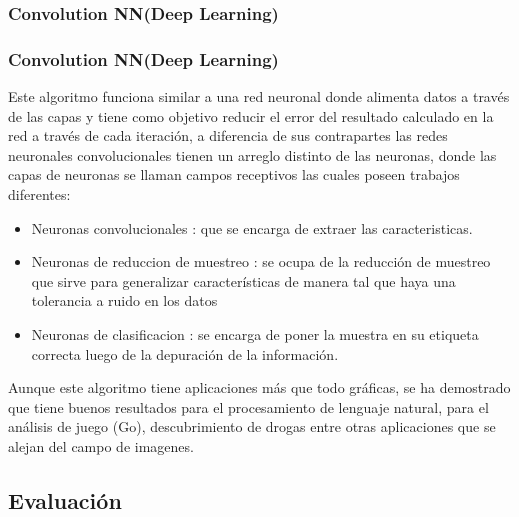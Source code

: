 \documentclass{beamer}
\begin{document}
\subsubsection{Convolution NN(Deep Learning)}
\begin{frame}
\frametitle{Convolution NN(Deep Learning)}
Este algoritmo funciona similar a una red neuronal donde alimenta datos a trav\'{e}s de las capas y tiene como objetivo reducir el error del resultado calculado en la red a trav\'{e}s de cada iteraci\'{o}n, a diferencia de sus contrapartes las redes neuronales convolucionales tienen un arreglo distinto de las neuronas, donde las capas de neuronas se llaman campos receptivos las cuales poseen trabajos diferentes:
\end{frame}
\begin{frame}
\begin{itemize}
 \item Neuronas convolucionales : que se encarga de extraer las caracteristicas. 
 \item Neuronas de reduccion de muestreo : se ocupa de la reducci\'{o}n de muestreo que sirve para generalizar caracter\'{i}sticas de manera tal que haya una tolerancia a ruido en los datos 
 \item Neuronas de clasificacion : se encarga de poner la muestra en su etiqueta correcta luego de la depuraci\'{o}n de la informaci\'{o}n.
\end{itemize}
  Aunque este algoritmo tiene aplicaciones m\'{a}s que todo gr\'{a}ficas, se ha demostrado que tiene buenos resultados para el procesamiento de lenguaje natural, para el an\'{a}lisis de juego (Go), descubrimiento de drogas entre otras aplicaciones que se alejan del campo de imagenes.
\end{frame}
\subsection{Evaluaci\'{o}n}
\end{document}
